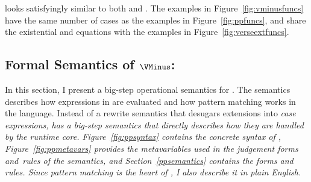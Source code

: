 \documentclass[manuscript,screen,review, 12pt, nonacm]{acmart}
\begin{document}
    \VMinus looks satisfyingly similar to both \PPlus and \VC. The \VMinus
    examples in Figure~\ref{fig:vminusfuncs} have the same number of cases as
    the \PPlus examples in Figure~\ref{fig:ppfuncs}, and share the existential
    and equations with the \VC examples in Figure~\ref{fig:verseextfuncs}. 
   




\subsection{Formal Semantics of $\VMinus$:}

In this section, I present a big-step operational semantics for \PPlus. The
semantics describes how expressions in \PPlus are evaluated and how pattern
matching works in the language. Instead of a rewrite semantics that desugars
extensions into \it{case} expressions, \PPlus has a big-step semantics that
directly describes how they are handled by the runtime core.
Figure~\ref{fig:ppsyntax} contains the concrete syntax of \PPlus,
Figure~\ref{fig:ppmetavars} provides the metavariables used in the judgement
forms and~rules of the semantics, and Section~\ref{ppsemantics} contains the
forms and rules. Since pattern matching is the heart of \PPlus, I also
describe it in plain English.
\end{document}
